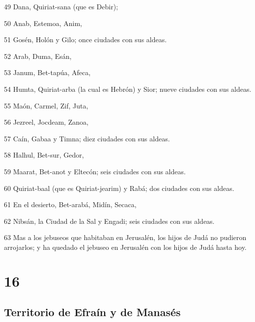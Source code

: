 \par 49 Dana, Quiriat-sana (que es Debir);
\par 50 Anab, Estemoa, Anim,
\par 51 Gosén, Holón y Gilo; once ciudades con sus aldeas.
\par 52 Arab, Duma, Esán,
\par 53 Janum, Bet-tapúa, Afeca,
\par 54 Humta, Quiriat-arba (la cual es Hebrón) y Sior; nueve ciudades con sus aldeas.
\par 55 Maón, Carmel, Zif, Juta,
\par 56 Jezreel, Jocdeam, Zanoa,
\par 57 Caín, Gabaa y Timna; diez ciudades con sus aldeas.
\par 58 Halhul, Bet-sur, Gedor,
\par 59 Maarat, Bet-anot y Eltecón; seis ciudades con sus aldeas.
\par 60 Quiriat-baal (que es Quiriat-jearim) y Rabá; dos ciudades con sus aldeas.
\par 61 En el desierto, Bet-arabá, Midín, Secaca,
\par 62 Nibsán, la Ciudad de la Sal y Engadi; seis ciudades con sus aldeas. 
\par 63 Mas a los jebuseos que habitaban en Jerusalén, los hijos de Judá no pudieron arrojarlos; y ha quedado el jebuseo en Jerusalén con los hijos de Judá hasta hoy. 

\chapter{16}

\section*{Territorio de Efraín y de Manasés}

